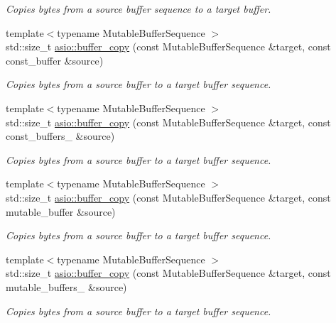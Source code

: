 \begin{DoxyCompactItemize}
\begin{DoxyCompactList}\small\item\em Copies bytes from a source buffer sequence to a target buffer. \end{DoxyCompactList}\item 
{\footnotesize template$<$typename Mutable\+Buffer\+Sequence $>$ }\\std\+::size\+\_\+t \hyperlink{group__buffer__copy_ga53ec05b1cae10cdc08b8768bd6b7b7b2}{asio\+::buffer\+\_\+copy} (const Mutable\+Buffer\+Sequence \&target, const const\+\_\+buffer \&source)
\begin{DoxyCompactList}\small\item\em Copies bytes from a source buffer to a target buffer sequence. \end{DoxyCompactList}\item 
{\footnotesize template$<$typename Mutable\+Buffer\+Sequence $>$ }\\std\+::size\+\_\+t \hyperlink{group__buffer__copy_ga980f80c33ea8e7287819bc1753a92f7b}{asio\+::buffer\+\_\+copy} (const Mutable\+Buffer\+Sequence \&target, const const\+\_\+buffers\+\_ \&source)
\begin{DoxyCompactList}\small\item\em Copies bytes from a source buffer to a target buffer sequence. \end{DoxyCompactList}\item 
{\footnotesize template$<$typename Mutable\+Buffer\+Sequence $>$ }\\std\+::size\+\_\+t \hyperlink{group__buffer__copy_ga805c350f27581373ee6c1d0fdcff92e0}{asio\+::buffer\+\_\+copy} (const Mutable\+Buffer\+Sequence \&target, const mutable\+\_\+buffer \&source)
\begin{DoxyCompactList}\small\item\em Copies bytes from a source buffer to a target buffer sequence. \end{DoxyCompactList}\item 
{\footnotesize template$<$typename Mutable\+Buffer\+Sequence $>$ }\\std\+::size\+\_\+t \hyperlink{group__buffer__copy_ga77fdccbc8ef71eca2becc0ae9b5a5921}{asio\+::buffer\+\_\+copy} (const Mutable\+Buffer\+Sequence \&target, const mutable\+\_\+buffers\+\_ \&source)
\begin{DoxyCompactList}\small\item\em Copies bytes from a source buffer to a target buffer sequence. \end{DoxyCompactList}\item 

\end{DoxyCompactItemize}
